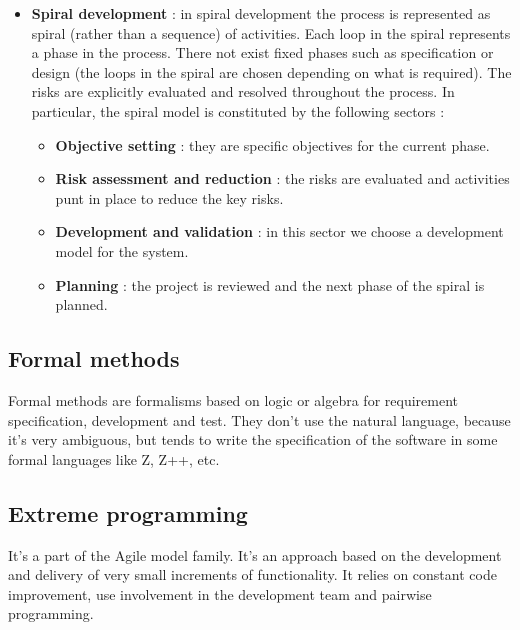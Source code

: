 \documentclass[11pt]{article}
\begin{document}
\begin{itemize}
\item \textbf{Spiral development} : in spiral development the process is represented as spiral (rather than a sequence) of activities. Each loop in the spiral represents a phase in the process. There not exist fixed phases such as specification or design (the loops in the spiral are chosen depending on what is required). The risks are explicitly evaluated and resolved throughout the process. In particular, the spiral model is constituted by the following sectors :
\begin{itemize}
\item \textbf{Objective setting} : they are specific objectives for the current phase.
\item \textbf{Risk assessment and reduction} : the risks are evaluated and activities punt in place to reduce the key risks.
\item \textbf{Development and validation} : in this sector we choose a development model for the system.
\item \textbf{Planning} : the project is reviewed and the next phase of the spiral is planned.
\end{itemize}
\end{itemize}
\subsection{Formal methods}
Formal methods are formalisms based on logic or algebra for requirement specification, development and test. They don't use the natural language, because it's very ambiguous, but tends to write the specification of the software in some formal languages like Z, Z++, etc.
\subsection{Extreme programming}
It's a part of the Agile model family. It's an approach based on the development and delivery of very small increments of functionality. It relies on constant code improvement, use involvement in the development team and pairwise programming.
\end{document}
